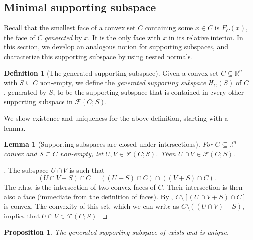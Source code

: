 \documentclass{article}
\theoremstyle{plain}
\newtheorem{lemma}{Lemma}[section]
\newtheorem{proposition}{Proposition}[section]
\theoremstyle{definition}
\newtheorem{definition}{Definition}[section]
\theoremstyle{remark}
\begin{document}
\subsection{Minimal supporting subspace}
\label{loc:narrative_for_conditional_subdifferentials.statement.minimal_supporting_subspace}
Recall that the smallest face of a convex set $C$ containing some $x \in C$
is $F_C(x)$, the face of $C$ \emph{generated} by $x$. It is the only face
with $x$ in its relative interior. In this section, we develop
an analogous notion for supporting subspaces, and characterize this
supporting subspace by using nested normals.
\begin{definition}[The generated supporting subspace]
\label{loc:generated_supporting_subspace.statement}
Given a convex set $C \subseteq \mathbb{R}^n$ with $S \subseteq C$ non-empty, 
we define the \emph{generated supporting subspace}
$H_C(S)$ of $C$, generated by $S$, to be the supporting subspace
that is contained in every other supporting subspace in $\mathcal{F}(C;S)$.
\end{definition}
We show existence and uniqueness for the above definition, starting with a lemma.
\begin{lemma}[Supporting subspaces are closed under intersections]
\label{loc:supporting_subspaces_are_closed_under_intersections.statement}
For $C \subseteq \mathbb{R}^n$ convex and $S \subseteq C$ non-empty, let $U, V \in \mathcal{F}(C; S)$. Then $U  \cap V \in \mathcal{F}(C;S)$.
\end{lemma}
\begin{proof}[\hypertarget{loc:supporting_subspaces_are_closed_under_intersections.proof}Proof of \Cref{loc:supporting_subspaces_are_closed_under_intersections.statement}]

The subspace $U \cap V$ is such that
\begin{equation*}
(U \cap V + S) \cap C = ((U + S) \cap C) \cap ((V + S) \cap C).
\end{equation*}
The r.h.s. is the intersection of two convex faces of $C$. Their intersection
is then also a face (immediate from the definition of faces).
By , $C \setminus [(U \cap V + S) \cap C]$
is convex. The convexity of this set, which we can write as $C \setminus ((U \cap V) + S)$,
implies that $U \cap V \in \mathcal{F}(C;S)$.
\end{proof}
\begin{proposition}
\label{loc:existence_and_uniqueness_of_the_generated_supporting_subspace.statement}
The generated supporting subspace of  exists and is unique. 
\end{proposition}
\end{document}
